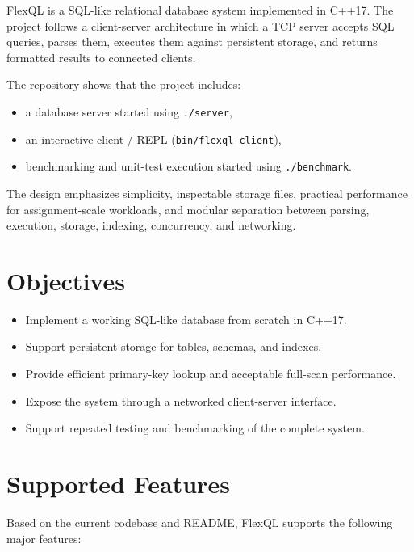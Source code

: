 \documentclass[12pt,a4paper]{article}
\begin{document}
FlexQL is a SQL-like relational database system implemented in C++17. The
project follows a client-server architecture in which a TCP server accepts SQL
queries, parses them, executes them against persistent storage, and returns
formatted results to connected clients.

The repository shows that the project includes:

\begin{itemize}[leftmargin=1.8em]
  \item a database server started using \texttt{./server},
  \item an interactive client / REPL (\texttt{bin/flexql-client}),
  \item benchmarking and unit-test execution started using \texttt{./benchmark}.
\end{itemize}

The design emphasizes simplicity, inspectable storage files, practical
performance for assignment-scale workloads, and modular separation between
parsing, execution, storage, indexing, concurrency, and networking.

\section{Objectives}

\begin{itemize}[leftmargin=1.8em]
  \item Implement a working SQL-like database from scratch in C++17.
  \item Support persistent storage for tables, schemas, and indexes.
  \item Provide efficient primary-key lookup and acceptable full-scan
        performance.
  \item Expose the system through a networked client-server interface.
  \item Support repeated testing and benchmarking of the complete system.
\end{itemize}

\section{Supported Features}

Based on the current codebase and README, FlexQL supports the following major
features:
\end{document}
